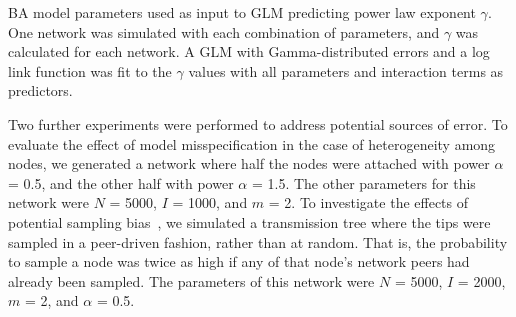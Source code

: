 %

\begin{table}
  \centering
  
  \caption[\gls{BA} parameters used as input \gls{GLM} predicting $\gamma$]
  {
    \gls{BA} model parameters used as input to \gls{GLM} predicting power law
    exponent $\gamma$. One network was simulated with each combination of
    parameters, and $\gamma$ was calculated for each network. A \gls{GLM} with
    Gamma-distributed errors and a log link function was fit to the $\gamma$
    values with all parameters and interaction terms as predictors.
  }
  \label{tab:gammaexpt}
\end{table}

Two further experiments were performed to address potential sources of error.
To evaluate the effect of model misspecification in the case of heterogeneity
among nodes, we generated a network where half the nodes were attached with
power $\alpha$ = 0.5, and the other half with power $\alpha$ = 1.5. The other
parameters for this network were $N$ = 5000, $I$ = 1000, and $m$ = 2. To
investigate the effects of potential sampling
bias~\autocite{karcher2016quantifying}, we simulated a transmission tree where
the tips were sampled in a peer-driven fashion, rather than at random. That is,
the probability to sample a node was twice as high if any of that node's
network peers had already been sampled. The parameters of this network were $N$
= 5000, $I$ = 2000, $m$ = 2, and $\alpha$ = 0.5.

